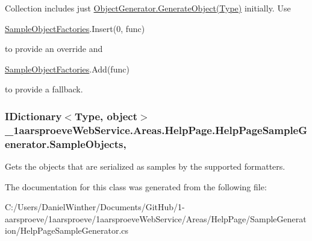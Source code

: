 Collection includes just \hyperlink{class__1aarsproeve_web_service_1_1_areas_1_1_help_page_1_1_object_generator_ad47fd6b8894401475144cf522d8767d0}{Object\+Generator.\+Generate\+Object(\+Type)} initially. Use 
\begin{DoxyCode}
\hyperlink{class__1aarsproeve_web_service_1_1_areas_1_1_help_page_1_1_help_page_sample_generator_a29295b515e45cebc44d8a111e9dd3d01}{SampleObjectFactories}.Insert(0, func)
\end{DoxyCode}
 to provide an override and 
\begin{DoxyCode}
\hyperlink{class__1aarsproeve_web_service_1_1_areas_1_1_help_page_1_1_help_page_sample_generator_a29295b515e45cebc44d8a111e9dd3d01}{SampleObjectFactories}.Add(func)
\end{DoxyCode}
 to provide a fallback.\hypertarget{class__1aarsproeve_web_service_1_1_areas_1_1_help_page_1_1_help_page_sample_generator_aa9621fc1bc0621b656579d3967528dcc}{}
\subsubsection[{Sample\+Objects}]{\setlength{\rightskip}{0pt plus 5cm}I\+Dictionary$<$Type, object$>$ \+\_\+1aarsproeve\+Web\+Service.\+Areas.\+Help\+Page.\+Help\+Page\+Sample\+Generator.\+Sample\+Objects\hspace{0.3cm}{\ttfamily [get]}, {\ttfamily [set]}}\label{class__1aarsproeve_web_service_1_1_areas_1_1_help_page_1_1_help_page_sample_generator_aa9621fc1bc0621b656579d3967528dcc}


Gets the objects that are serialized as samples by the supported formatters. 



The documentation for this class was generated from the following file\+:\begin{DoxyCompactItemize}
\item 
C\+:/\+Users/\+Daniel\+Winther/\+Documents/\+Git\+Hub/1-\/aarsproeve/1aarsproeve/1aarsproeve\+Web\+Service/\+Areas/\+Help\+Page/\+Sample\+Generation/Help\+Page\+Sample\+Generator.\+cs\end{DoxyCompactItemize}
